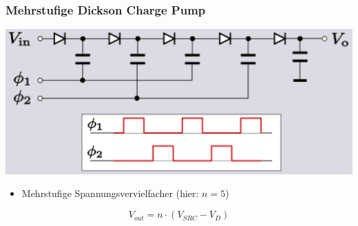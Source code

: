 \subsubsection{Mehrstufige Dickson Charge Pump}

\begin{minipage}[c]{0.5\columnwidth}
    \includegraphics[width=\columnwidth]{images/dickson_charge_pump_mehrstufig.png}
\end{minipage}
\hfill
\begin{minipage}[c]{0.48\columnwidth}
    \begin{itemize}
        \item Mehrstufige Spannungsvervielfacher (hier: $n = 5$)
    \end{itemize}

    $$ \boxed{ V_{out} = n \cdot (V_{SRC} - V_D) } $$
\end{minipage}